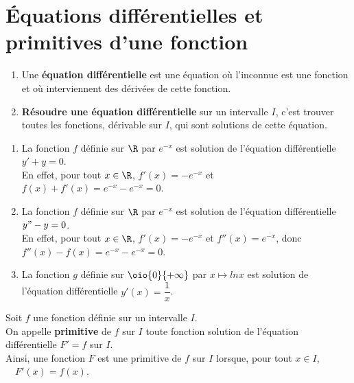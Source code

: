\documentclass[a4paper,11pt,cours]{nsi} %
\begin{document}
\section{Équations différentielles et primitives d'une fonction}
\begin{definition}
    \begin{enumerate}[label=\textbullet]
        \item Une \textbf{équation différentielle} est une équation où l'inconnue est une fonction et où interviennent des dérivées de cette fonction.
        \item \textbf{Résoudre une équation différentielle} sur un intervalle $I$, c'est trouver toutes les fonctions, dérivable sur $I$, qui sont solutions de cette équation.
    \end{enumerate}
\end{definition}

\begin{exemple}[s]
    \begin{enumerate}[label=\textbullet]
        \item La fonction $f$ définie sur $\R$ par $e^{-x}$ est solution de l'équation différentielle $y'+y=0$.\\
        En effet, pour tout $x\in\R$, $f'(x)=-e^{-x}$ et $f(x)+f'(x)=e^{-x}-e^{-x}=0$.
        \item La fonction $f$ définie sur $\R$ par $e^{-x}$ est solution de l'équation différentielle $y"-y=0$.\\
        En effet, pour tout $x\in\R$, $f'(x)=-e^{-x}$ et $f''(x)=e^{-x}$, donc $f''(x)-f(x)=e^{-x}-e^{-x}=0$.
        \item La fonction $g$ définie sur $\oio{0}{+\infty}$ par $x\mapsto ln x$ est solution de l'équation différentielle $y'(x)=\dfrac{1}{x}$.
    \end{enumerate}
\end{exemple}

\begin{definition}
    Soit $f$ une fonction définie sur un intervalle $I$.\\
    On appelle \textbf{primitive} de $f$ sur $I$ toute fonction solution de l'équation différentielle $F'=f$ sur $I$.\\[.5em]
    Ainsi, une fonction $F$ est une primitive de $f$ sur $I$ lorsque, pour tout $x\in I$, $\quad F'(x)=f(x)$.
\end{definition}
\end{document}
